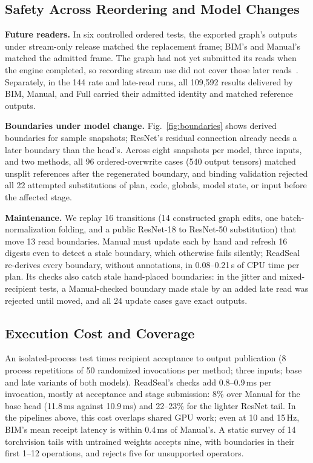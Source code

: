 \documentclass[conference]{IEEEtran}
\newcommand{\ms}{\,ms}
\newcommand{\Hz}{\,Hz}
\begin{document}
\subsection{Safety Across Reordering and Model Changes}
\label{sec:eval-safety}

\textbf{Future readers.} In six controlled ordered tests, the exported graph's outputs under stream-only release matched the replacement frame; BIM's and Manual's matched the admitted frame. The graph had not yet submitted its reads when the engine completed, so recording stream use did not cover those later reads~\cite{recordstream}. Separately, in the 144 rate and late-read runs, all 109,592 results delivered by BIM, Manual, and Full carried their admitted identity and matched reference outputs.

\textbf{Boundaries under model change.} Fig.~\ref{fig:boundaries} shows derived boundaries for sample snapshots; ResNet's residual connection already needs a later boundary than the head's. Across eight snapshots per model, three inputs, and two methods, all 96 ordered-overwrite cases (540 output tensors) matched unsplit references after the regenerated boundary, and binding validation rejected all 22 attempted substitutions of plan, code, globals, model state, or input before the affected stage.

\textbf{Maintenance.} We replay 16 transitions (14 constructed graph edits, one batch-normalization folding, and a public ResNet-18 to ResNet-50 substitution) that move 13 read boundaries. Manual must update each by hand and refresh 16 digests even to detect a stale boundary, which otherwise fails silently; ReadSeal re-derives every boundary, without annotations, in 0.08--0.21\,s of CPU time per plan. Its checks also catch stale hand-placed boundaries: in the jitter and mixed-recipient tests, a Manual-checked boundary made stale by an added late read was rejected until moved, and all 24 update cases gave exact outputs.

\subsection{Execution Cost and Coverage}
\label{sec:eval-cost}

An isolated-process test times recipient acceptance to output publication (8 process repetitions of 50 randomized invocations per method; three inputs; base and late variants of both models). ReadSeal's checks add 0.8--0.9\ms{} per invocation, mostly at acceptance and stage submission: 8\% over Manual for the base head (11.8\ms{} against 10.9\ms) and 22--23\% for the lighter ResNet tail. In the pipelines above, this cost overlaps shared GPU work; even at 10 and 15\Hz, BIM's mean receipt latency is within 0.4\ms{} of Manual's. A static survey of 14 torchvision tails with untrained weights accepts nine, with boundaries in their first 1--12 operations, and rejects five for unsupported operators.
\end{document}
